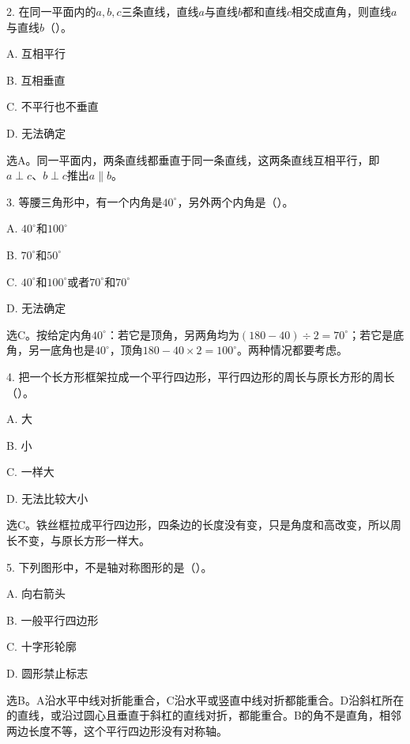 2. 在同一平面内的\(a,b,c\)三条直线，直线\(a\)与直线\(b\)都和直线\(c\)相交成直角，则直线\(a\)与直线\(b\)（\hspace{1.8em}）。\par
\noindent A. 互相平行\par
\noindent B. 互相垂直\par
\noindent C. 不平行也不垂直\par
\noindent D. 无法确定\par
\begin{BookAnswer}
选A。同一平面内，两条直线都垂直于同一条直线，这两条直线互相平行，即\(a\perp c\)、\(b\perp c\)推出\(a\parallel b\)。
\end{BookAnswer}

3. 等腰三角形中，有一个内角是\(40^\circ\)，另外两个内角是（\hspace{1.8em}）。\par
\noindent A. \(40^\circ\)和\(100^\circ\)\par
\noindent B. \(70^\circ\)和\(50^\circ\)\par
\noindent C. \(40^\circ\)和\(100^\circ\)或者\(70^\circ\)和\(70^\circ\)\par
\noindent D. 无法确定\par
\begin{BookAnswer}
选C。按给定内角\(40^\circ\)：若它是顶角，另两角均为\((180-40)\div2=70^\circ\)；若它是底角，另一底角也是\(40^\circ\)，顶角\(180-40\times2=100^\circ\)。两种情况都要考虑。
\end{BookAnswer}

4. 把一个长方形框架拉成一个平行四边形，平行四边形的周长与原长方形的周长（\hspace{1.8em}）。\par
\noindent A. 大\par
\noindent B. 小\par
\noindent C. 一样大\par
\noindent D. 无法比较大小\par
\begin{BookAnswer}
选C。铁丝框拉成平行四边形，四条边的长度没有变，只是角度和高改变，所以周长不变，与原长方形一样大。
\end{BookAnswer}

5. 下列图形中，不是轴对称图形的是（\hspace{1.8em}）。\par
\noindent A. 向右箭头\par
\noindent B. 一般平行四边形\par
\noindent C. 十字形轮廓\par
\noindent D. 圆形禁止标志\par
{}
\begin{BookAnswer}
选B。A沿水平中线对折能重合，C沿水平或竖直中线对折都能重合。D沿斜杠所在的直线，或沿过圆心且垂直于斜杠的直线对折，都能重合。B的角不是直角，相邻两边长度不等，这个平行四边形没有对称轴。
\end{BookAnswer}

